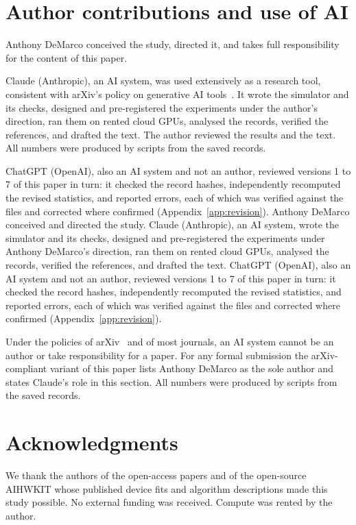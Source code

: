 \begin{sloppypar}
\end{sloppypar}

\section*{Author contributions and use of AI}
\ifdefined\arxivvariant
Anthony DeMarco conceived the study, directed it, and takes full responsibility for the content of this paper.

Claude (Anthropic), an AI system, was used extensively as a research tool, consistent with arXiv's policy on generative AI
tools~\cite{arxiv_policy}. It wrote the simulator and its checks, designed and pre-registered the experiments under the
author's direction, ran them on rented cloud GPUs, analysed the records, verified the references, and drafted the text. The
author reviewed the results and the text. All numbers were produced by scripts from the saved records.

ChatGPT (OpenAI), also an AI system and not an author, reviewed versions 1 to 7 of this paper in turn: it checked the
record hashes, independently recomputed the revised statistics, and reported errors, each of which was verified against
the files and corrected where confirmed (Appendix~\ref{app:revision}).
\else
Anthony DeMarco conceived and directed the study. Claude (Anthropic), an AI system, wrote the simulator and its checks, designed and
pre-registered the experiments under Anthony DeMarco's direction, ran them on rented cloud GPUs, analysed the records, verified the
references, and drafted the text. ChatGPT (OpenAI), also an AI system and not an author, reviewed versions 1 to 7 of this paper in turn: it checked the
record hashes, independently recomputed the revised statistics, and reported errors, each of which was verified against
the files and corrected where confirmed (Appendix~\ref{app:revision}).

Under the policies of arXiv~\cite{arxiv_policy} and of most journals, an AI system cannot be an author or take responsibility
for a paper. For any formal submission the arXiv-compliant variant of this paper lists Anthony DeMarco as the sole author and states
Claude's role in this section. All numbers were produced by scripts from the saved records.
\fi

\section*{Acknowledgments}
We thank the authors of the open-access papers and of the open-source AIHWKIT whose published device fits and algorithm
descriptions made this study possible. No external funding was received. Compute was rented by the author.




\appendix






